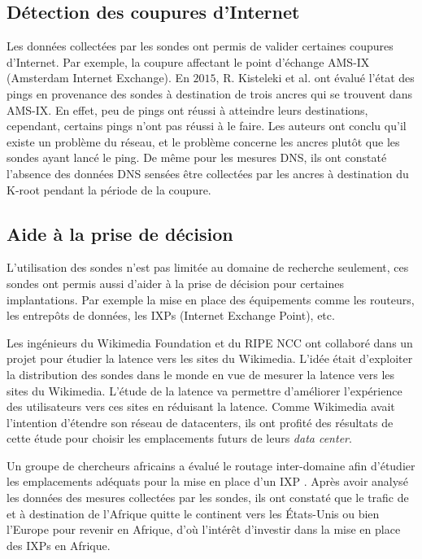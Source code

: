 \subsection{Détection des coupures d'Internet}

Les données collectées par les sondes  ont permis de valider certaines coupures d'Internet. Par exemple, la coupure affectant le point d'échange AMS-IX (Amsterdam Internet Exchange). En $2015$, R. Kisteleki  et al. \cite{Robert-Kisteleki}  ont évalué l'état des pings en provenance des sondes  à destination de trois ancres  qui se trouvent dans AMS-IX. En effet, peu de pings ont réussi à atteindre leurs destinations, cependant, certains pings n'ont pas réussi à le faire. 
Les auteurs ont conclu qu'il existe un problème du réseau, et le problème concerne  les ancres plutôt que les sondes ayant lancé le ping. De même pour les mesures DNS, ils ont constaté l'absence des données DNS sensées être collectées par les ancres  à destination du K-root pendant la période de la coupure.



\subsection{Aide à la prise de décision}
L'utilisation des sondes  n'est pas limitée au domaine de recherche seulement,  ces sondes ont permis aussi d'aider à la prise de décision pour certaines implantations. Par exemple la mise en place des équipements comme les routeurs, les entrepôts de données, les IXPs (Internet Exchange Point), etc. 

Les ingénieurs du Wikimedia Foundation et du RIPE NCC ont collaboré dans un projet \cite{Wikipedia} pour étudier la  latence vers les sites  du Wikimedia. L'idée était d'exploiter la distribution des sondes   dans le monde en vue  de mesurer la latence vers les sites du Wikimedia. L'étude de la latence va permettre d'améliorer l'expérience des utilisateurs vers ces sites  en réduisant la latence. Comme Wikimedia avait l'intention d'étendre son réseau de datacenters, ils ont profité des résultats de cette étude pour choisir les  emplacements futurs de leurs \textit{data center}.


Un groupe de chercheurs africains a évalué le routage inter-domaine afin d'étudier les emplacements adéquats pour la mise en place d'un IXP \cite{FANOU-Roderick}. Après avoir analysé les données des mesures collectées par les sondes, ils ont constaté que le trafic de et à destination de l'Afrique quitte le continent vers les États-Unis ou bien  l'Europe pour revenir en Afrique, d'où l'intérêt d'investir dans la mise en place des IXPs en Afrique.  \par


